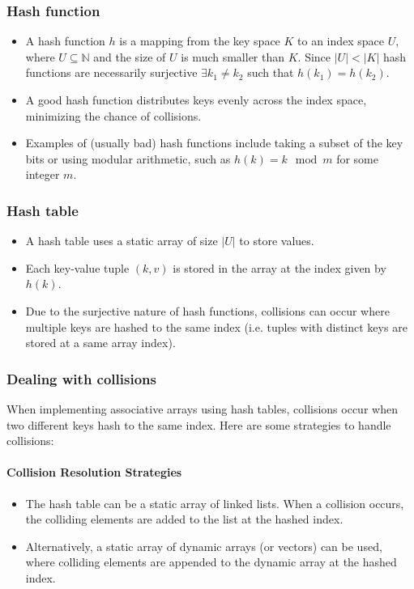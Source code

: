 \documentclass[12pt]{article}
\begin{document}
\subsubsection{Hash function}
\begin{itemize}
    \item A hash function \( h \) is a mapping from the key space \( K \) to an index space \( U \), where \( U \subseteq \mathbb{N} \) and the size of \( U \) is much smaller than \( K \). Since $|U| < |K|$ hash functions are necessarily surjective $\exists k_1 \neq k_2 $ such that $h(k_1)=h(k_2)$.
    \item A good hash function distributes keys evenly across the index space, minimizing the chance of collisions.
    \item Examples of (usually bad) hash functions include taking a subset of the key bits or using modular arithmetic, such as \( h(k) = k \mod m \) for some integer \( m \).
\end{itemize}

\subsubsection{Hash table}
\begin{itemize}
    \item A hash table uses a static array of size \( |U| \) to store values.
    \item Each key-value tuple \((k, v)\) is stored in the array at the index given by \( h(k) \).
    \item Due to the surjective nature of hash functions, collisions can occur where multiple keys are hashed to the same index (i.e. tuples with distinct keys are stored at a same array index).
\end{itemize}

\subsubsection{Dealing with collisions}
When implementing associative arrays using hash tables, collisions occur when two different keys hash to the same index. Here are some strategies to handle collisions:

\paragraph{Collision Resolution Strategies}
\begin{itemize}
    \item The hash table can be a static array of linked lists. When a collision occurs, the colliding elements are added to the list at the hashed index.
    \item Alternatively, a static array of dynamic arrays (or vectors) can be used, where colliding elements are appended to the dynamic array at the hashed index.
\end{itemize}
\end{document}
